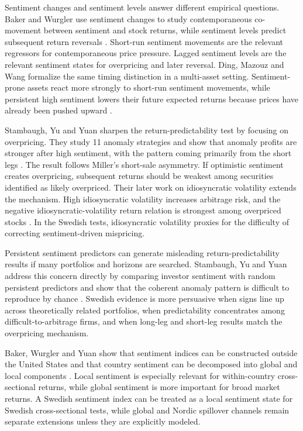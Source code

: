 \documentclass[11pt]{article}
\begin{document}
Sentiment changes and sentiment levels answer different empirical questions. Baker and Wurgler use sentiment changes to study contemporaneous co-movement between sentiment and stock returns, while sentiment levels predict subsequent return reversals \citep{baker2007}. Short-run sentiment movements are the relevant regressors for contemporaneous price pressure. Lagged sentiment levels are the relevant sentiment states for overpricing and later reversal. Ding, Mazouz and Wang formalize the same timing distinction in a multi-asset setting. Sentiment-prone assets react more strongly to short-run sentiment movements, while persistent high sentiment lowers their future expected returns because prices have already been pushed upward \citep{ding2019newtheory}.

Stambaugh, Yu and Yuan sharpen the return-predictability test by focusing on overpricing. They study 11 anomaly strategies and show that anomaly profits are stronger after high sentiment, with the pattern coming primarily from the short legs \citep{stambaugh2012short}. The result follows Miller's short-sale asymmetry. If optimistic sentiment creates overpricing, subsequent returns should be weakest among securities identified as likely overpriced. Their later work on idiosyncratic volatility extends the mechanism. High idiosyncratic volatility increases arbitrage risk, and the negative idiosyncratic-volatility return relation is strongest among overpriced stocks \citep{stambaugh2015ivol}. In the Swedish tests, idiosyncratic volatility proxies for the difficulty of correcting sentiment-driven mispricing.

Persistent sentiment predictors can generate misleading return-predictability results if many portfolios and horizons are searched. Stambaugh, Yu and Yuan address this concern directly by comparing investor sentiment with random persistent predictors and show that the coherent anomaly pattern is difficult to reproduce by chance \citep{stambaugh2014long}. Swedish evidence is more persuasive when signs line up across theoretically related portfolios, when predictability concentrates among difficult-to-arbitrage firms, and when long-leg and short-leg results match the overpricing mechanism.

Baker, Wurgler and Yuan show that sentiment indices can be constructed outside the United States and that country sentiment can be decomposed into global and local components \citep{baker2012global}. Local sentiment is especially relevant for within-country cross-sectional returns, while global sentiment is more important for broad market returns. A Swedish sentiment index can be treated as a local sentiment state for Swedish cross-sectional tests, while global and Nordic spillover channels remain separate extensions unless they are explicitly modeled.
\end{document}
